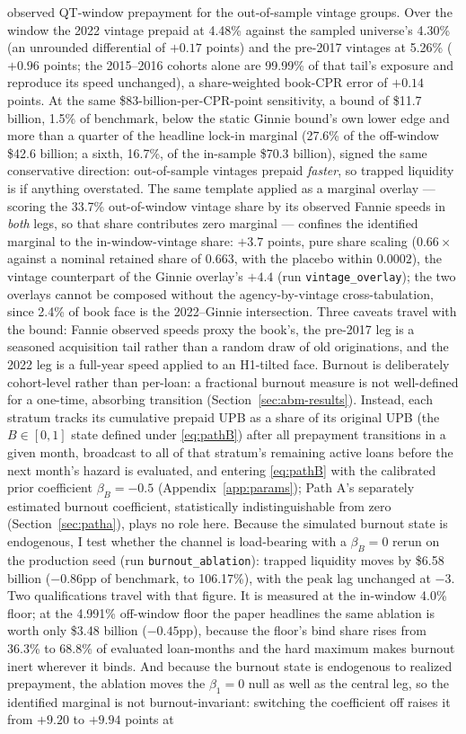 \documentclass[12pt]{article}
\begin{document}
observed QT-window prepayment for the out-of-sample vintage groups. Over the window the 2022 vintage prepaid at 4.48\% against the sampled universe's 4.30\% (an unrounded differential of $+0.17$ points) and the pre-2017 vintages at 5.26\% ($+0.96$ points; the 2015--2016 cohorts alone are 99.99\% of that tail's exposure and reproduce its speed unchanged), a share-weighted book-CPR error of $+0.14$ points. At the same \$83-billion-per-CPR-point sensitivity, a bound of \$11.7 billion, 1.5\% of benchmark, below the static Ginnie bound's own lower edge and more than a quarter of the headline lock-in marginal (27.6\% of the off-window \$42.6 billion; a sixth, 16.7\%, of the in-sample \$70.3 billion), signed the same conservative direction: out-of-sample vintages prepaid \emph{faster}, so trapped liquidity is if anything overstated. The same template applied as a marginal overlay --- scoring the 33.7\% out-of-window vintage share by its observed Fannie speeds in \emph{both} legs, so that share contributes zero marginal --- confines the identified marginal to the in-window-vintage share: $+3.7$ points, pure share scaling ($0.66\times$ against a nominal retained share of $0.663$, with the placebo within $0.0002$), the vintage counterpart of the Ginnie overlay's $+4.4$ (run \texttt{vintage\_overlay}); the two overlays cannot be composed without the agency-by-vintage cross-tabulation, since 2.4\% of book face is the 2022--Ginnie intersection. Three caveats travel with the bound: Fannie observed speeds proxy the book's, the pre-2017 leg is a seasoned acquisition tail rather than a random draw of old originations, and the 2022 leg is a full-year speed applied to an H1-tilted face. Burnout is deliberately cohort-level rather than per-loan: a fractional burnout measure is not well-defined for a one-time, absorbing transition (Section~\ref{sec:abm-results}). Instead, each stratum tracks its cumulative prepaid UPB as a share of its original UPB (the $B \in [0,1]$ state defined under \eqref{eq:pathB}) after all prepayment transitions in a given month, broadcast to all of that stratum's remaining active loans before the next month's hazard is evaluated, and entering \eqref{eq:pathB} with the calibrated prior coefficient $\beta_B = -0.5$ (Appendix~\ref{app:params}); Path A's separately estimated burnout coefficient, statistically indistinguishable from zero (Section~\ref{sec:patha}), plays no role here. Because the simulated burnout state is endogenous, I test whether the channel is load-bearing with a $\beta_B = 0$ rerun on the production seed (run \texttt{burnout\_ablation}): trapped liquidity moves by \$6.58 billion ($-0.86$pp of benchmark, to 106.17\%), with the peak lag unchanged at $-3$. Two qualifications travel with that figure. It is measured at the in-window 4.0\% floor; at the 4.991\% off-window floor the paper headlines the same ablation is worth only \$3.48 billion ($-0.45$pp), because the floor's bind share rises from 36.3\% to 68.8\% of evaluated loan-months and the hard maximum makes burnout inert wherever it binds. And because the burnout state is endogenous to realized prepayment, the ablation moves the $\beta_1 = 0$ null as well as the central leg, so the identified marginal is not burnout-invariant: switching the coefficient off raises it from $+9.20$ to $+9.94$ points at 
\end{document}
